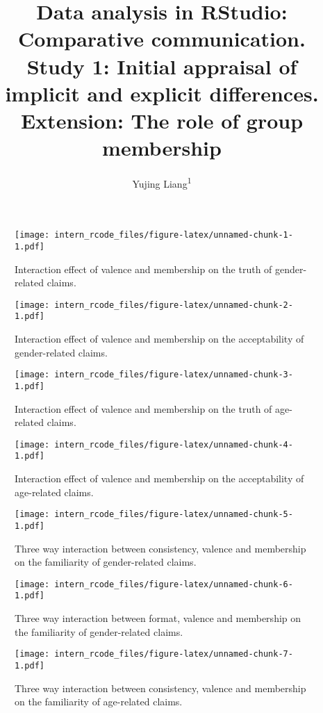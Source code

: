 \documentclass[man]{apa6}
\affiliation{
\vspace{0.5cm}
\textsuperscript{1} KU Leuven}
\title{Data analysis in RStudio: Comparative communication. Study 1: Initial
appraisal of implicit and explicit differences. Extension: The role of
group membership}
\author{Yujing Liang\textsuperscript{1}}
\date{}
\begin{document}
\maketitle

\begin{figure}
\centering
\texttt{[image: intern\_rcode\_files/figure-latex/unnamed-chunk-1-1.pdf]}
\caption{\label{fig:unnamed-chunk-1}Interaction effect of valence and
membership on the truth of gender-related claims.}
\end{figure}

\begin{figure}
\centering
\texttt{[image: intern\_rcode\_files/figure-latex/unnamed-chunk-2-1.pdf]}
\caption{\label{fig:unnamed-chunk-2}Interaction effect of valence and
membership on the acceptability of gender-related claims.}
\end{figure}

\begin{figure}
\centering
\texttt{[image: intern\_rcode\_files/figure-latex/unnamed-chunk-3-1.pdf]}
\caption{\label{fig:unnamed-chunk-3}Interaction effect of valence and
membership on the truth of age-related claims.}
\end{figure}

\begin{figure}
\centering
\texttt{[image: intern\_rcode\_files/figure-latex/unnamed-chunk-4-1.pdf]}
\caption{\label{fig:unnamed-chunk-4}Interaction effect of valence and
membership on the acceptability of age-related claims.}
\end{figure}

\begin{figure}
\centering
\texttt{[image: intern\_rcode\_files/figure-latex/unnamed-chunk-5-1.pdf]}
\caption{\label{fig:unnamed-chunk-5}Three way interaction between
consistency, valence and membership on the familiarity of gender-related
claims.}
\end{figure}

\begin{figure}
\centering
\texttt{[image: intern\_rcode\_files/figure-latex/unnamed-chunk-6-1.pdf]}
\caption{\label{fig:unnamed-chunk-6}Three way interaction between format,
valence and membership on the familiarity of gender-related claims.}
\end{figure}

\begin{figure}
\centering
\texttt{[image: intern\_rcode\_files/figure-latex/unnamed-chunk-7-1.pdf]}
\caption{\label{fig:unnamed-chunk-7}Three way interaction between
consistency, valence and membership on the familiarity of age-related
claims.}
\end{figure}
\end{document}
